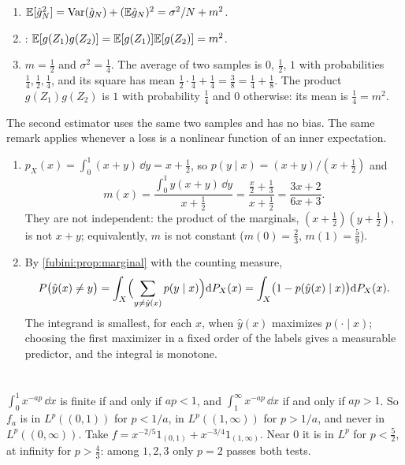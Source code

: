 \begin{enumerate}[nosep]
  \item $\mathbb{E}[\hat g_N^2] = \operatorname{Var}(\hat g_N) + (\mathbb{E}\hat g_N)^2
        = \sigma^2/N + m^2$.
  \item {}:
        $\mathbb{E}[g(Z_1)g(Z_2)] = \mathbb{E}[g(Z_1)]\mathbb{E}[g(Z_2)] = m^2$.
  \item $m = \frac12$ and $\sigma^2 = \frac14$. The average of two
        samples is $0$, $\frac12$, $1$ with probabilities
        $\frac14, \frac12, \frac14$, and its square has mean
        $\frac12\cdot\frac14 + \frac14 = \frac38
        = \frac14 + \frac18$. The product $g(Z_1)g(Z_2)$ is $1$ with
        probability $\frac14$ and $0$ otherwise: its mean is
        $\frac14 = m^2$.
\end{enumerate}
The second estimator uses the same two samples and has no bias. The
same remark applies whenever a loss is a nonlinear function of an
inner expectation.

\begin{enumerate}[nosep]
  \item $p_X(x) = \int_0^1(x + y)\,\dd y = x + \frac12$, so
        $p(y\mid x) = (x + y)/(x + \frac12)$ and
        \[
          m(x) = \frac{\int_0^1y(x + y)\,\dd y}{x + \frac12}
          = \frac{\frac x2 + \frac13}{x + \frac12}
          = \frac{3x + 2}{6x + 3} .
        \]
        They are not independent: the product of the marginals,
        $(x + \frac12)(y + \frac12)$, is not $x + y$; equivalently, $m$
        is not constant ($m(0) = \frac23$, $m(1) = \frac59$).
  \item By \cref{fubini:prop:marginal} with the counting measure,
        \[
          P\bigl(\hat y(x)\neq y\bigr)
          = \int_X\Bigl(\sum_{y\neq\hat y(x)}p(y\mid x)\Bigr)\mathrm{d} P_X(x)
          = \int_X\bigl(1 - p(\hat y(x)\mid x)\bigr)\mathrm{d} P_X(x) .
        \]
        The integrand is smallest, for each $x$, when $\hat y(x)$
        maximizes $p(\cdot\mid x)$; choosing the first maximizer in a
        fixed order of the labels gives a measurable predictor, and the
        integral is monotone.
\end{enumerate}

\section{}

$\int_0^1x^{-ap}\,\dd x$ is finite if and only if $ap < 1$, and
$\int_1^\infty x^{-ap}\,\dd x$ if and only if $ap > 1$. So $f_a$ is in
$L^p((0, 1))$ for $p < 1/a$, in $L^p((1, \infty))$ for $p > 1/a$, and
never in $L^p((0, \infty))$. Take
$f = x^{-2/5}1_{(0, 1)} + x^{-3/4}1_{(1, \infty)}$. Near $0$ it is in
$L^p$ for $p < \frac52$, at infinity for $p > \frac43$: among
$1, 2, 3$ only $p = 2$ passes both tests.


